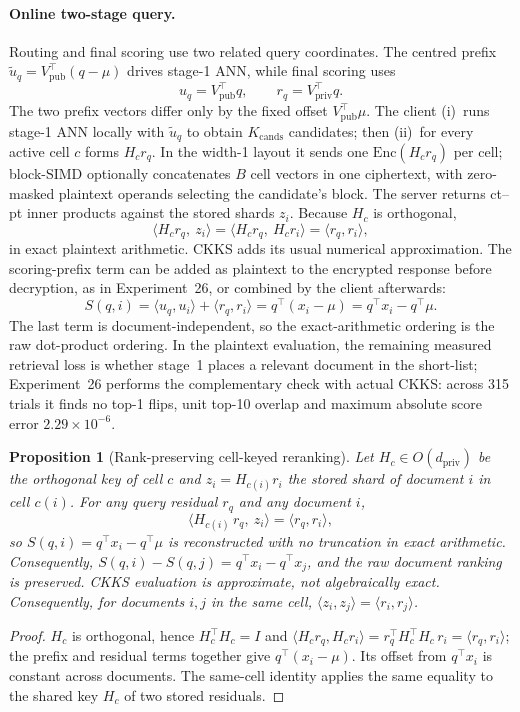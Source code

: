 \documentclass[11pt,a4paper]{article}
\newtheorem{proposition}{Proposition}
\begin{document}
\paragraph{Online two-stage query.} Routing and final scoring use two related
query coordinates. The centred prefix
$\widetilde u_q=V_{\mathrm{pub}}^\top(q-\mu)$ drives stage-1 ANN, while final
scoring uses
\[
u_q=V_{\mathrm{pub}}^\top q,\qquad
r_q=V_{\mathrm{priv}}^\top q.
\]
The two prefix vectors differ only by the fixed offset
$V_{\mathrm{pub}}^\top\mu$. The client (i)~runs stage-1 ANN locally with
$\widetilde u_q$ to obtain $K_{\mathrm{cands}}$ candidates; then (ii)~for
every active cell $c$ forms $H_c r_q$. In the width-1 layout it sends one
$\mathrm{Enc}(H_c r_q)$ per cell; block-SIMD optionally concatenates $B$
cell vectors in one ciphertext, with zero-masked plaintext operands selecting
the candidate's block. The server returns ct--pt inner products against the
stored shards $z_i$. Because $H_c$
is orthogonal,
\[
\langle H_c r_q,\ z_i\rangle=\langle H_c r_q,\ H_c r_i\rangle=\langle r_q, r_i\rangle ,
\]
in exact plaintext arithmetic. CKKS adds its usual numerical approximation.
The scoring-prefix term can be added as plaintext to the encrypted response
before decryption, as in Experiment~26, or combined by the client afterwards:
\[
S(q,i)=\langle u_q,u_i\rangle+\langle r_q,r_i\rangle
=q^\top(x_i-\mu)=q^\top x_i-q^\top\mu .
\]
The last term is document-independent, so the exact-arithmetic ordering is the
raw dot-product ordering. In the plaintext evaluation, the remaining measured
retrieval loss is whether stage~1 places a relevant document in the short-list;
Experiment~26 performs the complementary check with actual CKKS: across 315
trials it finds no top-1 flips, unit top-10 overlap and maximum absolute score
error $2.29\times10^{-6}$.

\begin{proposition}[Rank-preserving cell-keyed reranking]\label{prop:exact}
Let $H_c\in O(d_{\mathrm{priv}})$ be the orthogonal key of cell $c$ and
$z_i=H_{c(i)}r_i$ the stored shard of document $i$ in cell $c(i)$. For any
query residual $r_q$ and any document $i$,
\[
\big\langle H_{c(i)}\,r_q,\ z_i\big\rangle=\langle r_q,r_i\rangle ,
\]
so $S(q,i)=q^\top x_i-q^\top\mu$ is reconstructed with no truncation in
exact arithmetic. Consequently,
$S(q,i)-S(q,j)=q^\top x_i-q^\top x_j$, and the raw document ranking is
preserved. CKKS evaluation is approximate, not algebraically exact.
Consequently, for documents $i,j$ in the \emph{same} cell,
$\langle z_i,z_j\rangle=\langle r_i,r_j\rangle$.
\end{proposition}
\begin{proof}
$H_c$ is orthogonal, hence $H_c^\top H_c=I$ and
$\langle H_c r_q,H_c r_i\rangle=r_q^\top H_c^\top H_c\,r_i=\langle r_q,r_i\rangle$;
the prefix and residual terms together give $q^\top(x_i-\mu)$. Its offset
from $q^\top x_i$ is constant across documents. The same-cell identity
applies the same equality to the shared key $H_c$ of two stored residuals.
\end{proof}
\end{document}
